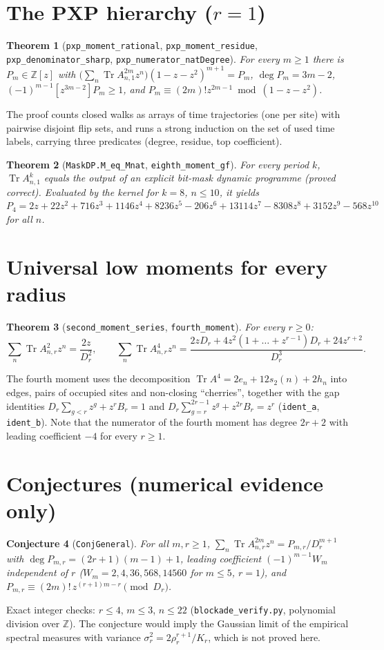 \documentclass[11pt]{article}
\newtheorem{theorem}{Theorem}
\newtheorem{conjecture}[theorem]{Conjecture}
\theoremstyle{remark}\newtheorem{remark}[theorem]{Remark}
\begin{document}
\section{The PXP hierarchy ($r=1$)}
\begin{theorem}[\texttt{pxp\_moment\_rational}, \texttt{pxp\_moment\_residue}, \texttt{pxp\_denominator\_sharp}, \texttt{pxp\_numerator\_natDegree}]
For every $m\ge1$ there is $P_m\in\mathbb Z[z]$ with $\bigl(\sum_n\operatorname{Tr}A_{n,1}^{2m}z^n\bigr)(1-z-z^2)^{m+1}=P_m$, $\deg P_m=3m-2$, $(-1)^{m-1}[z^{3m-2}]P_m\ge1$, and $P_m\equiv(2m)!z^{2m-1}\bmod(1-z-z^2)$.
\end{theorem}
The proof counts closed walks as arrays of time trajectories (one per site) with pairwise disjoint flip sets, and runs a strong induction on the set of used time labels, carrying three predicates (degree, residue, top coefficient).
\begin{theorem}[\texttt{MaskDP.M\_eq\_Mnat}, \texttt{eighth\_moment\_gf}]
For every period $k$, $\operatorname{Tr}A_{n,1}^k$ equals the output of an explicit bit-mask dynamic programme (proved correct). Evaluated by the kernel for $k=8$, $n\le10$, it yields
$P_4=2z+22z^2+716z^3+1146z^4+8236z^5-206z^6+13114z^7-8308z^8+3152z^9-568z^{10}$ for all $n$.
\end{theorem}

\section{Universal low moments for every radius}
\begin{theorem}[\texttt{second\_moment\_series}, \texttt{fourth\_moment}]
For every $r\ge0$:
\[\sum_n\operatorname{Tr}A_{n,r}^2z^n=\frac{2z}{D_r^2},\qquad
\sum_n\operatorname{Tr}A_{n,r}^4z^n=\frac{2zD_r+4z^2(1+\dots+z^{r-1})D_r+24z^{r+2}}{D_r^3}.\]
\end{theorem}
The fourth moment uses the decomposition $\operatorname{Tr}A^4=2e_n+12s_2(n)+2h_n$ into edges, pairs of occupied sites and non-closing ``cherries'', together with the gap identities $D_r\sum_{g<r}z^g+z^rB_r=1$ and $D_r\sum_{g=r}^{2r-1}z^g+z^{2r}B_r=z^r$ (\texttt{ident\_a}, \texttt{ident\_b}).
Note that the numerator of the fourth moment has degree $2r+2$ with leading coefficient $-4$ for every $r\ge1$.

\section{Conjectures (numerical evidence only)}
\begin{conjecture}[\texttt{ConjGeneral}]
For all $m,r\ge1$, $\sum_n\operatorname{Tr}A_{n,r}^{2m}z^n=P_{m,r}/D_r^{m+1}$ with $\deg P_{m,r}=(2r+1)(m-1)+1$, leading coefficient $(-1)^{m-1}W_m$ independent of $r$ ($W_m=2,4,36,568,14560$ for $m\le5$, $r=1$), and $P_{m,r}\equiv(2m)!\,z^{(r+1)m-r}\pmod{D_r}$.
\end{conjecture}
Exact integer checks: $r\le4$, $m\le3$, $n\le22$ (\texttt{blockade\_verify.py}, polynomial division over $\mathbb Z$). The conjecture would imply the Gaussian limit of the empirical spectral measures with variance $\sigma_r^2=2\rho_r^{r+1}/K_r$, which is not proved here.
\end{document}
